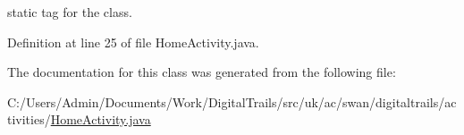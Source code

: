 static tag for the class. 



Definition at line 25 of file Home\+Activity.\+java.



The documentation for this class was generated from the following file\+:\begin{DoxyCompactItemize}
\item 
C\+:/\+Users/\+Admin/\+Documents/\+Work/\+Digital\+Trails/src/uk/ac/swan/digitaltrails/activities/\hyperlink{_home_activity_8java}{Home\+Activity.\+java}\end{DoxyCompactItemize}
